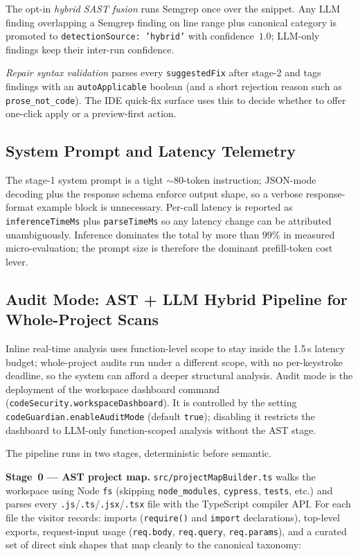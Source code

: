 The opt-in \emph{hybrid SAST fusion} runs Semgrep once over the snippet. Any LLM finding overlapping a Semgrep finding on line range plus canonical category is promoted to \texttt{detectionSource: 'hybrid'} with confidence~$1.0$; LLM-only findings keep their inter-run confidence.

\emph{Repair syntax validation} parses every \texttt{suggestedFix} after stage-2 and tags findings with an \texttt{autoApplicable} boolean (and a short rejection reason such as \texttt{prose\_not\_code}). The IDE quick-fix surface uses this to decide whether to offer one-click apply or a preview-first action.

\subsection{System Prompt and Latency Telemetry}

The stage-1 system prompt is a tight ${\sim}80$-token instruction; JSON-mode decoding plus the response schema enforce output shape, so a verbose response-format example block is unnecessary. Per-call latency is reported as \texttt{inferenceTimeMs} plus \texttt{parseTimeMs} so any latency change can be attributed unambiguously. Inference dominates the total by more than $99\%$ in measured micro-evaluation; the prompt size is therefore the dominant prefill-token cost lever.

\subsection{Audit Mode: AST + LLM Hybrid Pipeline for Whole-Project Scans}
\label{sec:impl-audit-mode}

Inline real-time analysis uses function-level scope to stay inside the 1.5\,s latency budget; whole-project audits run under a different scope, with no per-keystroke deadline, so the system can afford a deeper structural analysis. Audit mode is the deployment of the workspace dashboard command (\texttt{codeSecurity.workspaceDashboard}). It is controlled by the setting \texttt{codeGuardian.enableAuditMode} (default \texttt{true}); disabling it restricts the dashboard to LLM-only function-scoped analysis without the AST stage.

The pipeline runs in two stages, deterministic before semantic.

\textbf{Stage~0 --- AST project map.} \texttt{src/projectMapBuilder.ts} walks the workspace using Node \texttt{fs} (skipping \texttt{node\_modules}, \texttt{cypress}, \texttt{tests}, etc.) and parses every \texttt{.js}/\texttt{.ts}/\texttt{.jsx}/\texttt{.tsx} file with the TypeScript compiler API. For each file the visitor records: imports (\texttt{require()} and \texttt{import} declarations), top-level exports, request-input usage (\texttt{req.body}, \texttt{req.query}, \texttt{req.params}), and a curated set of direct sink shapes that map cleanly to the canonical taxonomy:

